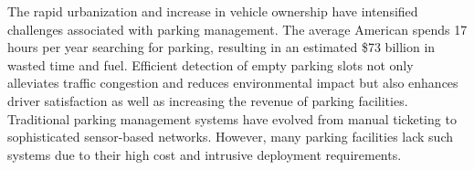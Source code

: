 








The rapid urbanization and increase in vehicle ownership have intensified challenges associated with parking management. The average American spends 17 hours per year searching for parking, resulting in an estimated \$73 billion in wasted time and fuel\cite{Inrix}. Efficient detection of empty parking slots not only alleviates traffic congestion and reduces environmental impact but also enhances driver satisfaction as well as increasing the revenue of parking facilities\cite{7895130}. Traditional parking management systems have evolved from manual ticketing to sophisticated sensor-based networks. However, many parking facilities lack such systems due to their high cost and intrusive deployment requirements.




